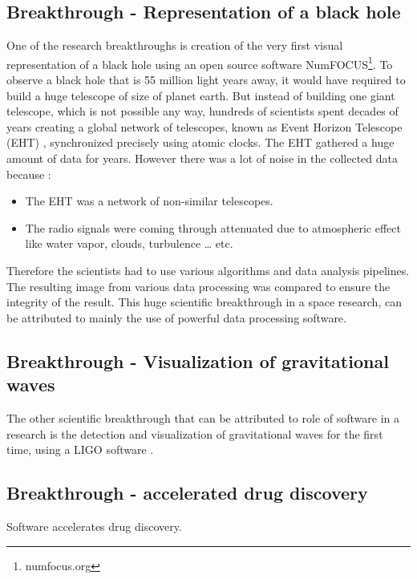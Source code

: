\subsection{Breakthrough - Representation of a black hole  }

One of the research breakthroughs is creation of the very first visual representation of a black hole using an open source software NumFOCUS\footnote{numfocus.org}. To observe a black hole that is 55 million light years away, it would have required to build a huge telescope of size of planet earth. But instead of building one giant telescope, which is not possible any way, hundreds of scientists spent decades of years creating a global network of telescopes, known as Event Horizon Telescope (EHT) \citep{enwiki:1052167868}, synchronized precisely using atomic clocks. The \ac{EHT} gathered a huge amount of data for years. However there was a lot of noise in the collected data because :

\vspace{-1mm}   %
	\begin{itemize}%
		\item The \ac{EHT} was a network of non-similar telescopes.
		\item The radio signals were coming through attenuated due to atmospheric effect like water vapor, clouds, turbulence … etc.
	\end{itemize}
Therefore the scientists had to use various algorithms and data analysis pipelines. The resulting image from various data processing was compared to ensure the integrity of the result. This huge scientific breakthrough in a space research, can be attributed to mainly the use of powerful data processing software. 

\subsection{Breakthrough - Visualization of gravitational waves }
The other scientific breakthrough that can be attributed to role of software in a research is the detection and visualization of gravitational waves for the first time, using a LIGO software \citep{enwiki:1047100294, mukherji2017report}. 

\subsection{Breakthrough - accelerated drug discovery }
Software accelerates drug discovery\citep{bhati2021pandemic}.



